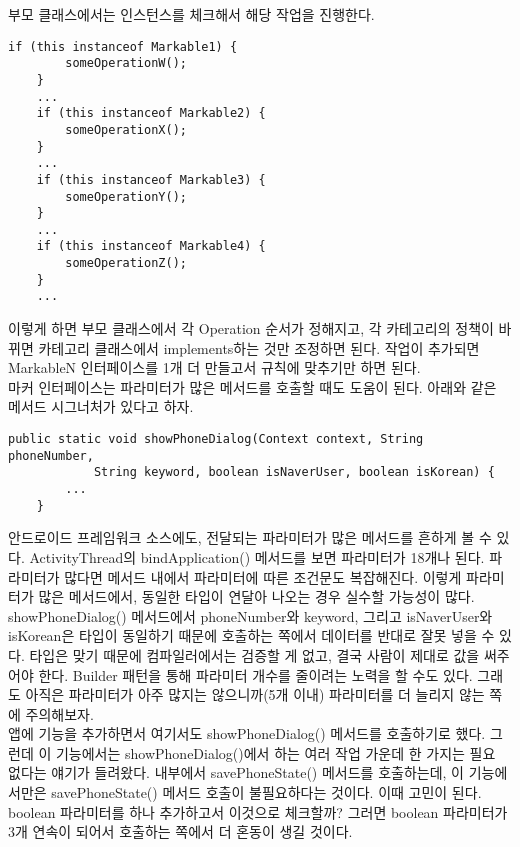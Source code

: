  
부모 클래스에서는 인스턴스를 체크해서 해당 작업을 진행한다.
\begin{lstlisting}[frame=single]
	if (this instanceof Markable1) { 
		someOperationW();
	}
 	...
	if (this instanceof Markable2) { 
		someOperationX();
	}
	...
	if (this instanceof Markable3) { 
		someOperationY(); 
	} 
	...
	if (this instanceof Markable4) { 
		someOperationZ();
	}
	...
\end{lstlisting}
이렇게 하면 부모 클래스에서 각 Operation 순서가 정해지고, 
각 카테고리의 정책이 바뀌면 카테고리 클래스에서 implements하는 것만 조정하면 된다.
작업이 추가되면 MarkableN 인터페이스를 1개 더 만들고서 규칙에 맞추기만 하면 된다.\\

마커 인터페이스는 파라미터가 많은 메서드를 호출할 때도 도움이 된다.
아래와 같은 메서드 시그너처가 있다고 하자.
\begin{lstlisting}[frame=single]
	public static void showPhoneDialog(Context context, String phoneNumber, 
			String keyword, boolean isNaverUser, boolean isKorean) {
		...
	}
\end{lstlisting}

안드로이드 프레임워크 소스에도, 전달되는 파라미터가 많은 메서드를 흔하게 볼 수 있다. ActivityThread의 bindApplication() 메서드를 보면 파라미터가 18개나 된다.
파라미터가 많다면 메서드 내에서 파라미터에 따른 조건문도 복잡해진다.
이렇게 파라미터가 많은 메서드에서, 동일한 타입이 연달아 나오는 경우 실수할 가능성이 많다. 
showPhoneDialog() 메서드에서 phoneNumber와 keyword, 그리고 isNaverUser와 isKorean은 타입이 동일하기 때문에 호출하는 쪽에서 데이터를 반대로 잘못 넣을 수 있다.
타입은 맞기 때문에 컴파일러에서는 검증할 게 없고, 결국 사람이 제대로 값을 써주어야 한다.
Builder 패턴을 통해 파라미터 개수를 줄이려는 노력을 할 수도 있다. 그래도 아직은 파라미터가 아주 많지는 않으니까(5개 이내) 파라미터를 더 늘리지 않는 쪽에 주의해보자.\\

앱에 기능을 추가하면서 여기서도 showPhoneDialog() 메서드를 호출하기로 했다.
그런데 이 기능에서는 showPhoneDialog()에서 하는 여러 작업 가운데 한 가지는 필요 없다는 얘기가 들려왔다. 
내부에서 savePhoneState() 메서드를 호출하는데, 이 기능에서만은 savePhoneState() 메서드 호출이 불필요하다는 것이다.
이때 고민이 된다. boolean 파라미터를 하나 추가하고서 이것으로 체크할까? 
그러면 boolean 파라미터가 3개 연속이 되어서 호출하는 쪽에서 더 혼동이 생길 것이다.\\

